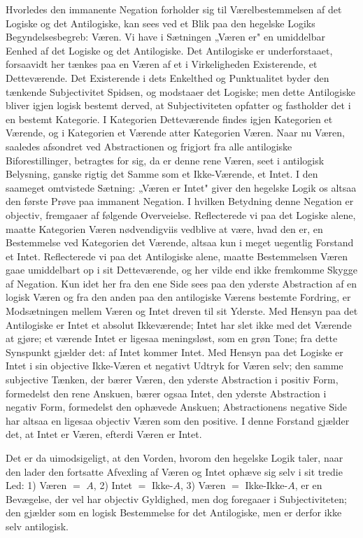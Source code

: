 \documentclass[12pt]{book}
\newcommand{\opage}[1]{\marginnote{\footnotesize\textit{[#1]}}}
\begin{document}
Hvorledes den immanente Negation forholder sig til Værelbestemmelsen af det Logiske og det
Antilogiske, kan sees ved et Blik paa den hegelske Logiks Begyndelsesbegreb: Væren. Vi have i
Sætningen „Væren er" en umiddelbar Eenhed af det Logiske og det Antilogiske. Det Antilogiske
er underforstaaet, forsaavidt her tænkes paa en Væren af et i Virkeligheden Existerende, et
Detteværende. Det Existerende i dets Enkelthed og Punktualitet byder den tænkende
Subjectivitet Spidsen, og modstaaer det Logiske; men dette Antilogiske bliver igjen logisk
bestemt derved, at Subjectiviteten opfatter og fastholder det i en bestemt Kategorie. I
Kategorien Detteværende findes igjen Kategorien et Værende, og i Kategorien
\opage{150} et Værende atter Kategorien Væren. Naar nu Væren, saaledes afsondret ved Abstractionen og
frigjort fra alle antilogiske Biforestillinger, betragtes for sig, da er denne rene Væren,
seet i antilogisk Belysning, ganske rigtig det Samme som et Ikke-Værende, et Intet. I den
saameget omtvistede Sætning: „Væren er Intet" giver den hegelske Logik os altsaa den første
Prøve paa immanent Negation. I hvilken Betydning denne Negation er objectiv, fremgaaer af
følgende Overveielse. Reflecterede vi paa det Logiske alene, maatte Kategorien Væren
nødvendigviis vedblive at være, hvad den er, en Bestemmelse ved Kategorien det Værende, altsaa
kun i meget uegentlig Forstand et Intet. Reflecterede vi paa det Antilogiske alene, maatte
Bestemmelsen Væren gaae umiddelbart op i sit Detteværende, og her vilde end ikke fremkomme
Skygge af Negation. Kun idet her fra den ene Side sees paa den yderste Abstraction af en
logisk Væren og fra den anden paa den antilogiske Værens bestemte Fordring, er Modsætningen
mellem Væren og Intet dreven til sit Yderste. Med Hensyn paa det Antilogiske er Intet et
absolut Ikkeværende; Intet har slet ikke med det Værende at gjøre; et værende Intet er ligesaa
meningsløst, som en grøn Tone; fra dette Synspunkt gjælder det: af Intet kommer Intet. Med
Hensyn paa det Logiske er Intet i sin objective Ikke-Væren et negativt Udtryk for Væren selv;
den samme subjective Tænken, der bærer Væren, den yderste Abstraction i positiv Form,
formedelst den rene Anskuen, bærer ogsaa Intet, den yderste Abstraction i negativ Form,
formedelst den ophævede Anskuen; Abstractionens negative Side har altsaa en ligesaa objectiv
Væren som den positive. I denne Forstand gjælder det, at Intet er Væren, efterdi Væren er
Intet.

Det er da uimodsigeligt, at den Vorden, hvorom den hegelske Logik taler, naar den lader den
fortsatte Afvexling af Væren og Intet ophæve sig selv i sit tredie Led: 1) Væren $=$ $A$, 2)
\opage{151} Intet $=$ Ikke-$A$, 3) Væren $=$ Ikke-Ikke-$A$, er en Bevægelse, der vel har objectiv
Gyldighed, men dog foregaaer i Subjectiviteten; den gjælder som en logisk Bestemmelse for det
Antilogiske, men er derfor ikke selv antilogisk.
\end{document}
